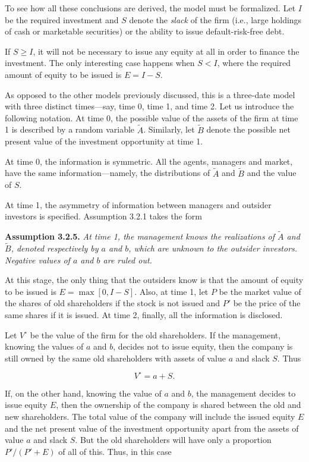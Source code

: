 \documentclass[11pt,a4paper]{article}
\begin{document}
To see how all these conclusions are derived, the model must be formalized. Let \(I\) be the
required investment and \(S\) denote the \emph{slack} of the firm (i.e., large holdings of cash or
marketable securities) or the ability to issue default-risk-free debt.

If \(S \geq I\), it will not be necessary to issue any equity at all in order to finance the
investment. The only interesting case happens when \(S < I\), where the required amount of equity to
be issued is \(E = I - S\).

As opposed to the other models previously discussed, this is a three-date model with three distinct
times---say, time 0, time 1, and time 2. Let us introduce the following notation. At time 0, the
possible value of the assets of the firm at time 1 is described by a random variable
\(\widetilde{A}\). Similarly, let \(\widetilde{B}\) denote the possible net present value of the
investment opportunity at time 1.

At time 0, the information is symmetric. All the agents, managers and market, have the same
information---namely, the distributions of \(\widetilde{A}\) and \(\widetilde{B}\) and the value of
\(S\).

At time 1, the asymmetry of information between managers and outsider investors is specified.
Assumption 3.2.1 takes the form

\textbf{Assumption 3.2.5.} \emph{At time 1, the management knows the realizations of
\(\widetilde{A}\) and \(\widetilde{B}\), denoted respectively by \(a\) and \(b\), which are unknown
to the outsider investors. Negative values of \(a\) and \(b\) are ruled out.}

At this stage, the only thing that the outsiders know is that the amount of equity to be issued is
\(E = \max[0, I - S]\). Also, at time 1, let \(P\) be the market value of the shares of old
shareholders if the stock is not issued and \(P'\) be the price of the same shares if it is issued.
At time 2, finally, all the information is disclosed.

Let \(V^\circ\) be the value of the firm for the old shareholders. If the management, knowing the
values of \(a\) and \(b\), decides not to issue equity, then the company is still owned by the same
old shareholders with assets of value \(a\) and slack \(S\). Thus

\[V^\circ = a + S.\]

If, on the other hand, knowing the value of \(a\) and \(b\), the management decides to issue equity
\(E\), then the ownership of the company is shared between the old and new shareholders. The total
value of the company will include the issued equity \(E\) and the net present value of the
investment opportunity apart from the assets of value \(a\) and slack \(S\). But the old
shareholders will have only a proportion \(P'/(P' + E)\) of all of this. Thus, in this case
\end{document}
